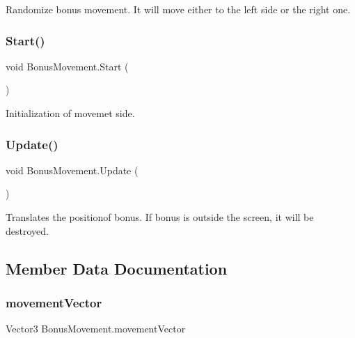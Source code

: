Randomize bonus movement. It will move either to the left side or the right one. 

\mbox{\label{class_bonus_movement_af3228316fa495638dcdb186e09e5649a}} 
\subsubsection{\texorpdfstring{Start()}{Start()}}
{\footnotesize\ttfamily void Bonus\+Movement.\+Start (\begin{DoxyParamCaption}{ }\end{DoxyParamCaption})\hspace{0.3cm}{\ttfamily [private]}}



Initialization of movemet side. 

\mbox{\label{class_bonus_movement_a11644c2fe7b847b9d7710378a48a48d6}} 
\subsubsection{\texorpdfstring{Update()}{Update()}}
{\footnotesize\ttfamily void Bonus\+Movement.\+Update (\begin{DoxyParamCaption}{ }\end{DoxyParamCaption})\hspace{0.3cm}{\ttfamily [private]}}



Translates the positionof bonus. If bonus is outside the screen, it will be destroyed. 



\subsection{Member Data Documentation}
\mbox{\label{class_bonus_movement_a8f34e489370f3d6538641b3f44b2c77c}} 
\subsubsection{\texorpdfstring{movement\+Vector}{movementVector}}
{\footnotesize\ttfamily Vector3 Bonus\+Movement.\+movement\+Vector\hspace{0.3cm}{\ttfamily [private]}}



